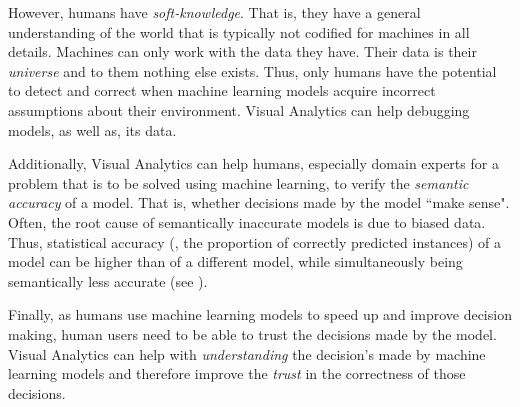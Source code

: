 However, humans have \emph{soft-knowledge}.
That is, they have a general understanding of the world that is typically not codified for machines in all details.
Machines can only work with the data they have.
Their data is their \emph{universe} and to them nothing else exists.
Thus, only humans have the potential to detect and correct when machine learning models acquire incorrect assumptions about their environment.
Visual Analytics can help debugging models, as well as, its data.

Additionally, Visual Analytics can help humans, especially domain experts for a problem that is to be solved using machine learning, to verify the \emph{semantic accuracy} of a model.
That is, whether decisions made by the model ``make sense".
Often, the root cause of semantically inaccurate models is due to biased data.
Thus, statistical accuracy (\ie, the proportion of correctly predicted instances) of a model can be higher than of a different model, while simultaneously being semantically less accurate (see \cite{Caruana:2015:IMH:2783258.2788613,explainer}).

Finally, as humans use machine learning models to speed up and improve decision making, human users need to be able to trust the decisions made by the model.
Visual Analytics can help with \emph{understanding} the decision's made by machine learning models and therefore improve the \emph{trust} in the correctness of those decisions.